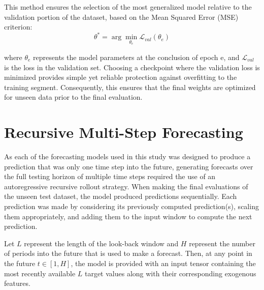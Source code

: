 This method ensures the selection of the most generalized model relative to the validation portion of the dataset, based on the Mean Squared Error (MSE) criterion:
$$\theta^{*} = \arg\min_{\theta_e} \mathcal{L}_{val}(\theta_e)$$


where $\theta_e$ represents the model parameters at the conclusion of epoch e, and $\mathcal{L}_{val}$ is the loss in the validation set. Choosing a checkpoint where the validation loss is minimized provides simple yet reliable protection against overfitting to the training segment. Consequently, this ensures that the final weights are optimized for unseen data prior to the final evaluation.

\section{Recursive Multi-Step Forecasting }

\label{sec:multi_step_forecasting}

As each of the forecasting models used in this study was designed to produce a prediction that was only one time step into the future, generating forecasts over the full testing horizon of multiple time steps required the use of an autoregressive recursive rollout strategy. When making the final evaluations of the unseen test dataset, the model produced predictions sequentially. Each prediction was made by considering its previously computed prediction(s), scaling them appropriately, and adding them to the input window to compute the next prediction.

Let $L$ represent the length of the look-back window and $H$ represent the number of periods into the future that is used to make a forecast. Then, at any point in the future $t \in [1,H]$, the model is provided with an input tensor containing the most recently available $L$ target values along with their corresponding exogenous features.

